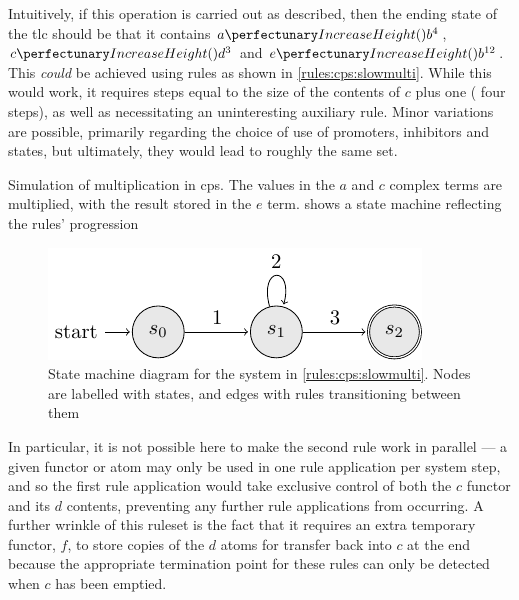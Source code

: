 Intuitively, if this operation is carried out as described, then the ending state of the \gls{tlc} should be that it contains \(\cpfunc{a}{b^4}\), \(\cpfunc{c}{d^3}\) and \(\cpfunc{e}{b^{12}}\).  This \emph{could} be achieved using rules as shown in \cref{rules:cps:slowmulti}.  While this would work, it requires steps equal to the size of the contents of \(c\) plus one (\ie{} four steps), as well as necessitating an uninteresting auxiliary rule.  Minor variations are possible, primarily regarding the choice of use of \glspl{promoter}, \glspl{inhibitor} and states, but ultimately, they would lead to roughly the same set.

\begin{cprulesetfloat}
    \begin{cpruleset}
        
    
    \end{cpruleset}
    \caption[Simulation of multiplication in cP systems]{\label{rules:cps:slowmulti}Simulation of multiplication in \gls{cps}.  The values in the \(a\) and \(c\) complex terms are multiplied, with the result stored in the \(e\) term.   shows a state machine reflecting the rules' progression}
\end{cprulesetfloat}

\begin{figure}
    \centering
    \includegraphics{chapters/cpsystems/ruleset1statemachine.pdf}
    \caption[State machine diagram for the system in \cref{rules:cps:slowmulti}]{State machine diagram for the system in \cref{rules:cps:slowmulti}.  Nodes are labelled with states, and edges with rules transitioning between them}
    \label{fig:cps:slowmulti}
\end{figure}

In particular, it is not possible here to make the second rule work in parallel --- a given functor or atom may only be used in one rule application per system step, and so the first rule application would take exclusive control of both the \(c\) functor and its \(d\) contents, preventing any further rule applications from occurring.  A further wrinkle of this \gls{ruleset} is the fact that it requires an extra temporary functor, \(f\), to store copies of the \(d\) atoms for transfer back into \(c\) at the end because the appropriate termination point for these rules can only be detected when \(c\) has been emptied.

